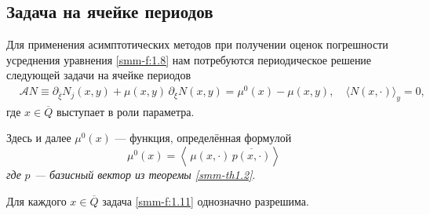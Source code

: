 \subsection{Задача на ячейке периодов}

Для применения асимптотических методов при получении оценок погрешности усреднения
уравнения \eqref{smm-f:1.8} нам потребуются периодическое
решение следующей задачи на ячейке периодов
\begin{equation}\label{smm-f:1.11}
	\begin{aligned}
		&\mathcal{A}N\equiv \partial_{\bar\xi}N_j(x,y)+\mu(x,y)\,\partial_\xi N(x,y) =\mu^0(x)-\mu(x,y), \quad \langle N(x,\cdot)\rangle_y=0,
			\end{aligned}
\end{equation}
где $x\in \overline Q$ выступает в роли параметра.


{Здесь и далее  $\mu^0(x)$ --- функция, определённая
	формулой}
	\begin{equation*}
	\mu^0(x)=\left<\,\mu(x,\cdot)\,\overline{p(x,\cdot)}\right>
\end{equation*}
\textit{где} 	\textit{$p$ ---  базисный вектор из теоремы {\ref{smm-th1.2}}}.

\begin{theorem}\label{smm-th1.3}
Для каждого $x\in\overline{Q}$ задача \eqref{smm-f:1.11}
	однозначно разрешима.
\end{theorem}


